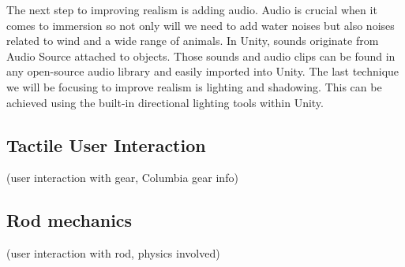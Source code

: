 \documentclass[10pt,journal,compsoc,onecolumn, draftclsnofoot]{IEEEtran}
\begin{document}
The next step to improving realism is adding audio. Audio is crucial when it comes to immersion so not only will we need to add water noises but also noises related to wind and a wide range of animals. In Unity, sounds originate from Audio Source attached to objects. Those sounds and audio clips can be found in any open-source audio library and easily imported into Unity. The last technique we will be focusing to improve realism is lighting and shadowing. This can be achieved using the built-in directional lighting tools within Unity.

\subsection{Tactile User Interaction}
(user interaction with gear, Columbia gear info)

\subsection{Rod mechanics}
(user interaction with rod, physics involved)





% 
% 
\end{document}
